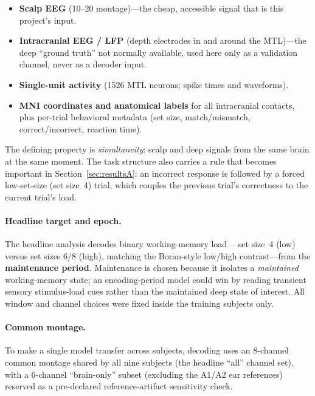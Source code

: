 \documentclass[11pt]{article}
\begin{document}
\begin{itemize}[nosep]
  \item \textbf{Scalp EEG} (10--20 montage)---the cheap, accessible signal that is this project's
  input.
  \item \textbf{Intracranial EEG / LFP} (depth electrodes in and around the MTL)---the deep
  ``ground truth'' not normally available, used here only as a validation channel, never as a
  decoder input.
  \item \textbf{Single-unit activity} (1526 MTL neurons; spike times and waveforms).
  \item \textbf{MNI coordinates and anatomical labels} for all intracranial contacts, plus
  per-trial behavioral metadata (set size, match/mismatch, correct/incorrect, reaction time).
\end{itemize}

The defining property is \emph{simultaneity}: scalp and deep signals from the same brain at the
same moment. The task structure also carries a rule that becomes important in
Section~\ref{sec:resultsA}: an incorrect response is followed by a forced low-set-size (set
size~4) trial, which couples the previous trial's correctness to the current trial's load.

\paragraph{Headline target and epoch.} The headline analysis decodes binary working-memory load
---set size~4 (low) versus set sizes 6/8 (high), matching the Boran-style low/high contrast---from
the \textbf{maintenance period}. Maintenance is chosen because it isolates a \emph{maintained}
working-memory state; an encoding-period model could win by reading transient sensory
stimulus-load cues rather than the maintained deep state of interest. All window and channel
choices were fixed inside the training subjects only.

\paragraph{Common montage.} To make a single model transfer across subjects, decoding uses an
8-channel common montage shared by all nine subjects (the headline ``all'' channel set), with a
6-channel ``brain-only'' subset (excluding the A1/A2 ear references) reserved as a pre-declared
reference-artifact sensitivity check.

\end{document}
